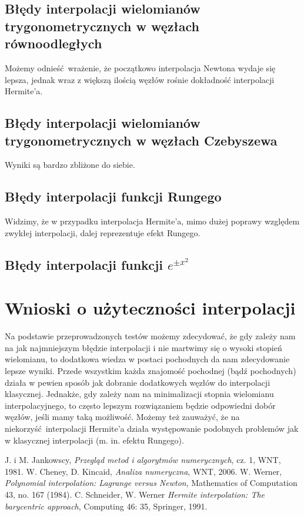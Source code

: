 \documentclass[10pt,wide]{mwart}
\theoremstyle{definition}
\begin{document}
\subsection{Błędy interpolacji wielomianów trygonometrycznych w węzłach równoodległych}
Możemy odnieść wrażenie, że początkowo interpolacja Newtona wydaje się lepsza, jednak wraz z większą ilością węzłów rośnie dokładność interpolacji Hermite'a.
\subsection{Błędy interpolacji wielomianów trygonometrycznych w węzłach Czebyszewa}
Wyniki są bardzo zbliżone do siebie.
\subsection{Błędy interpolacji funkcji Rungego}
Widzimy, że w przypadku interpolacja Hermite'a, mimo dużej poprawy względem zwykłej interpolacji, dalej reprezentuje efekt Rungego.
\subsection{Błędy interpolacji funkcji \(e^{\pm x^2}\)}

\section{Wnioski o użyteczności interpolacji }
Na podstawie przeprowadzonych testów możemy zdecydować, że gdy zależy nam na jak najmniejszym błędzie interpolacji i nie martwimy się o wysoki stopień wielomianu, to dodatkowa wiedza w postaci pochodnych da nam zdecydowanie lepsze wyniki.
Przede wszystkim każda znajomość pochodnej (bądź pochodnych) działa w pewien sposób jak dobranie dodatkowych węzłów do interpolacji klasycznej.
Jednakże, gdy zależy nam na minimalizacji stopnia wielomianu interpolacyjnego, to często lepszym rozwiązaniem będzie odpowiedni dobór węzłów, jeśli mamy taką możliwość.
Możemy też zauważyć, że na niekorzyść interpolacji Hermite'a działa występowanie podobnych problemów jak w klasycznej interpolacji (m. in. efektu Rungego).


\begin{thebibliography}{9}
\itemsep10pt
 J. i M. Jankowscy, \emph{Przegląd metod i algorytmów numerycznych}, cz. 1, WNT, 1981.
 W. Cheney, D. Kincaid, \emph{Analiza numeryczna}, WNT, 2006.
 W. Werner, \emph{Polynomial interpolation: Lagrange versus Newton}, Mathematics of Computation 43, no. 167 (1984).
 C. Schneider, W. Werner \emph{Hermite interpolation: The barycentric approach}, Computing 46: 35, Springer, 1991.
\end{thebibliography}
\end{document}
